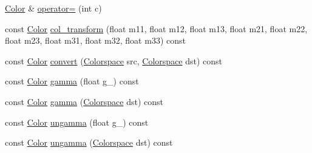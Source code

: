 \begin{DoxyCompactItemize}
\item 
\hyperlink{classtrimesh_1_1Color}{Color} \& \hyperlink{classtrimesh_1_1Color_a5adc5202c414bedff8834df834ee7b7b}{operator=} (int c)
\item 
const \hyperlink{classtrimesh_1_1Color}{Color} \hyperlink{classtrimesh_1_1Color_ab36b9ceebc09353d2513fb5ef3adbacf}{col\+\_\+transform} (float m11, float m12, float m13, float m21, float m22, float m23, float m31, float m32, float m33) const
\item 
const \hyperlink{classtrimesh_1_1Color}{Color} \hyperlink{classtrimesh_1_1Color_a684dabf3f7e2011c6c5288e91a12215b}{convert} (\hyperlink{classtrimesh_1_1Color_a2e472a2f6056fb5d0d835ee1c361b6da}{Colorspace} src, \hyperlink{classtrimesh_1_1Color_a2e472a2f6056fb5d0d835ee1c361b6da}{Colorspace} dst) const
\item 
const \hyperlink{classtrimesh_1_1Color}{Color} \hyperlink{classtrimesh_1_1Color_a3540c038c7f993120eed3d3683797b02}{gamma} (float g\+\_\+) const
\item 
const \hyperlink{classtrimesh_1_1Color}{Color} \hyperlink{classtrimesh_1_1Color_aed131184642ab0047a27cc5b5b305acd}{gamma} (\hyperlink{classtrimesh_1_1Color_a2e472a2f6056fb5d0d835ee1c361b6da}{Colorspace} dst) const
\item 
const \hyperlink{classtrimesh_1_1Color}{Color} \hyperlink{classtrimesh_1_1Color_a26bd1dd5b2521e58e0a80d98b76a8fbe}{ungamma} (float g\+\_\+) const
\item 
const \hyperlink{classtrimesh_1_1Color}{Color} \hyperlink{classtrimesh_1_1Color_a053596dda07bead7e3f63b3ee5cb4625}{ungamma} (\hyperlink{classtrimesh_1_1Color_a2e472a2f6056fb5d0d835ee1c361b6da}{Colorspace} dst) const
\end{DoxyCompactItemize}
